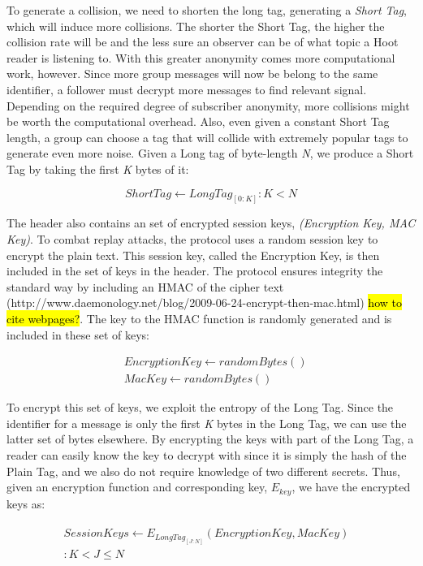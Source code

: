 To generate a collision, we need to shorten the long tag, generating a \textit{Short Tag}, which will induce more collisions. The shorter the Short Tag, the higher the collision rate will be and the less sure an observer can be of what topic a Hoot reader is listening to. With this greater anonymity comes more computational work, however. Since more group messages will now be belong to the same identifier, a follower must decrypt more messages to find relevant signal. Depending on the required degree of subscriber anonymity, more collisions might be worth the computational overhead. Also, even given a constant Short Tag length, a group can choose a tag that will collide with extremely popular tags to generate even more noise. Given a Long tag of byte-length \textit{N}, we produce a Short Tag by taking the first \textit{K} bytes of it:

\begin{equation*}
	\mathit{ShortTag} \leftarrow \mathit{LongTag}_{[0:K]} : K < N
\end{equation*}

The header also contains an set of encrypted session keys, \textit{(Encryption Key, MAC Key)}. To combat replay attacks, the protocol uses a random session key to encrypt the plain text. This session key, called the Encryption Key, is then included in the set of keys in the header. The protocol ensures integrity the standard way by including an HMAC of the cipher text (http://www.daemonology.net/blog/2009-06-24-encrypt-then-mac.html) \hl{how to cite webpages?}. The key to the HMAC function is randomly generated and is included in these set of keys: 

\begin{align*}
	& \mathit{EncryptionKey} \leftarrow \mathit{randomBytes}\left(\right) \\
	& \mathit{MacKey} \leftarrow \mathit{randomBytes}\left(\right)
\end{align*}

To encrypt this set of keys, we exploit the entropy of the Long Tag. Since the identifier for a message is only the first \textit{K} bytes in the Long Tag, we can use the latter set of bytes elsewhere. By encrypting the keys with part of the Long Tag, a reader can easily know the key to decrypt with since it is simply the hash of the Plain Tag, and we also do not require knowledge of two different secrets. Thus, given an encryption function and corresponding key, \textit{$E_{key}$}, we have the encrypted keys as:

\begin{align*}
\begin{split}
	\mathit{Session Keys} \leftarrow E_{\mathit{LongTag}_{[J:N]}}\left(\mathit{EncryptionKey},\mathit{MacKey}\right)& \\
	: K < J \leq N &
\end{split}	
\end{align*}

